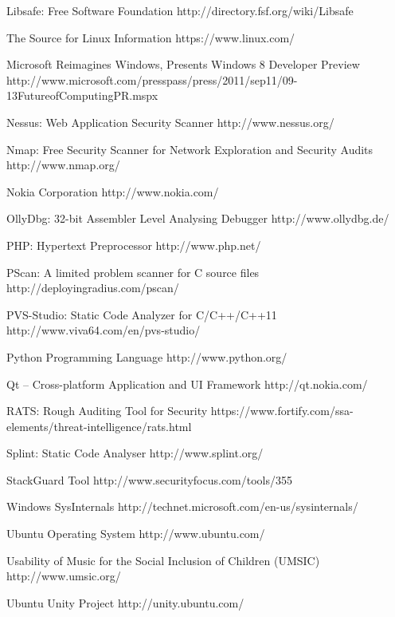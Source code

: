\begin{thebibliography}{9}
		{Libsafe: Free Software Foundation}
		{http://directory.fsf.org/wiki/Libsafe}

		{The Source for Linux Information}
		{https://www.linux.com/}

		{Microsoft Reimagines Windows, Presents Windows 8 Developer Preview}
		{http://www.microsoft.com/presspass/press/2011/sep11/09-13FutureofComputingPR.mspx}

		{Nessus: Web Application Security Scanner}
		{http://www.nessus.org/}

		{Nmap: Free Security Scanner for Network Exploration and Security Audits}
		{http://www.nmap.org/}

		{Nokia Corporation}
		{http://www.nokia.com/}

		{OllyDbg: 32-bit Assembler Level Analysing Debugger}
		{http://www.ollydbg.de/}

		{PHP: Hypertext Preprocessor}
		{http://www.php.net/}

		{PScan: A limited problem scanner for C source files}
		{http://deployingradius.com/pscan/}

		{PVS-Studio: Static Code Analyzer for C/C++/C++11}
		{http://www.viva64.com/en/pvs-studio/}

		{Python Programming Language}
		{http://www.python.org/}
		
		{Qt -- Cross-platform Application and UI Framework}
		{http://qt.nokia.com/}

		{RATS: Rough Auditing Tool for Security}
		{https://www.fortify.com/ssa-elements/threat-intelligence/rats.html}

		{Splint: Static Code Analyser}
		{http://www.splint.org/}
	
		{StackGuard Tool}
		{http://www.securityfocus.com/tools/355}

		{Windows SysInternals}
		{http://technet.microsoft.com/en-us/sysinternals/}

		{Ubuntu Operating System}
		{http://www.ubuntu.com/}

		{Usability of Music for the Social Inclusion of Children (UMSIC)}
		{http://www.umsic.org/}
		
		{Ubuntu Unity Project}
		{http://unity.ubuntu.com/}


\end{thebibliography}

